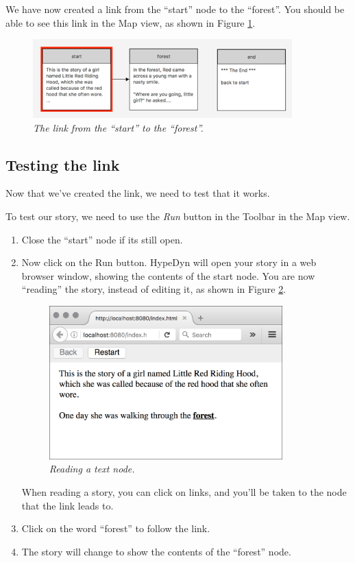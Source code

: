 \documentclass{article}
\begin{document}
We have now created a link from the ``start'' node to the ``forest''. You should be able to see this link in the Map view, as shown in Figure \ref{fig:tut1:new_link_mapview}.
  
\begin{figure}[ht]
  \centering
  \includegraphics[width=10cm]{images/hypedyn-tutorial-1-figure-9}
  \caption{\textit{The link from the ``start'' to the ``forest''.}}
  \label{fig:tut1:new_link_mapview}
\end{figure} 

\subsection{Testing the link}

Now that we've created the link, we need to test that it works.

To test our story, we need to use the \textit{Run} button in the Toolbar in the Map view.

\begin{enumerate}
  \item Close the ``start'' node if its still open.
  \item Now click on the Run button. HypeDyn will open your story in a web browser window, showing the contents of the start node. You are now ``reading'' the story, instead of editing it, as shown in Figure \ref{fig:tut1:reading}.

\begin{figure}[ht]
  \centering
  \includegraphics[width=9cm]{images/hypedyn-tutorial-1-figure-10}
  \caption{\textit{Reading a text node.}}
  \label{fig:tut1:reading}
\end{figure} 

When reading a story, you can click on links, and you'll be taken to the node that the link leads to.

\item Click on the word ``forest'' to follow the link.
\item The story will change to show the contents of the ``forest'' node.
\end{enumerate}
\end{document}
